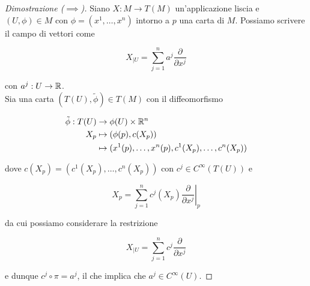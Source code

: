 \begin{proof}[Dimostrazione ($ \implies $)]
	Siano $ X : M \to T(M) $ un'applicazione liscia e $ (U,\phi) \in M $ con $ \phi = (x^{1},\dots,x^{n}) $ intorno a $ p $ una carta di $ M $. Possiamo scrivere il campo di vettori come
	
	\begin{equation}
		X_{|U} = \sum_{j=1}^{n} a^{j} \dfrac{\partial}{\partial x^{j}}
	\end{equation}

	con $ a^{j} : U \to \mathbb{R} $.\\
	Sia una carta $ (T(U),\tilde{\phi}) \in T(M) $ con il diffeomorfismo
	
	\begin{align}
		\begin{split}
			\tilde{\phi} : T(U) &\to \phi(U) \times \mathbb{R}^{n}\\
			X_{p} &\mapsto (\phi(p),c(X_{p}))\\
			&\mapsto (x^{1}(p),\dots,x^{n}(p),c^{1}(X_{p}),\dots,c^{n}(X_{p}))
		\end{split}
	\end{align}

	dove $ c(X_{p}) = (c^{1}(X_{p}),\dots,c^{n}(X_{p})) $ con $ c^{j} \in C^{\infty}(T(U)) $ e
	
	\begin{equation}
		X_{p} = \sum_{j=1}^{n} c^{j}(X_{p}) \left. \dfrac{\partial}{\partial x^{j}} \right|_{p}
	\end{equation}

	da cui possiamo considerare la restrizione
	
	\begin{equation}
		X_{|U} = \sum_{j=1}^{n} c^{j} \dfrac{\partial}{\partial x^{j}}
	\end{equation}

	e dunque $ c^{j} \circ \pi = a^{j} $, il che implica che $ a^{j} \in C^{\infty}(U) $.
\end{proof}

